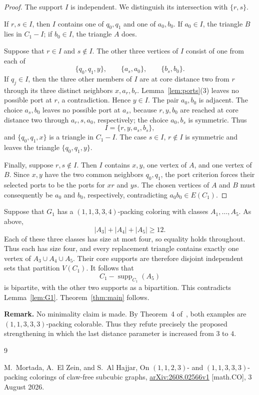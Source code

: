 \documentclass[11pt]{amsart}
\newcommand{\supp}{\operatorname{supp}}
\begin{document}
\begin{proof}
The support $I$ is independent. We distinguish its intersection with
$\{r,s\}$.

If $r,s\in I$, then $I$ contains one of $q_0,q_1$ and one of $a_0,b_0$.
If $a_0\in I$, the triangle $B$ lies in $C_1-I$; if $b_0\in I$, the
triangle $A$ does.

Suppose that $r\in I$ and $s\notin I$. The other three vertices of $I$
consist of one from each of
\[
 \{q_0,q_1,y\},\qquad \{a_s,a_0\},\qquad \{b_s,b_0\}.
\]
If $q_j\in I$, then the three other members of $I$ are at core distance
two from $r$ through its three distinct neighbors $x,a_r,b_r$.
Lemma~\ref{lem:ports}(3) leaves no possible port at $r$, a contradiction.
Hence $y\in I$. The pair $a_0,b_0$ is adjacent. The choice $a_s,b_0$
leaves no possible port at $a_s$, because $r,y,b_0$ are reached at core
distance two through $a_r,s,a_0$, respectively; the choice $a_0,b_s$ is
symmetric. Thus
\[
 I=\{r,y,a_s,b_s\},
\]
and $\{q_0,q_1,x\}$ is a triangle in $C_1-I$. The case
$s\in I$, $r\notin I$ is symmetric and leaves the triangle
$\{q_0,q_1,y\}$.

Finally, suppose $r,s\notin I$. Then $I$ contains $x,y$, one vertex of
$A$, and one vertex of $B$. Since $x,y$ have the two common neighbors
$q_0,q_1$, the port criterion forces their selected ports to be the ports
for $xr$ and $ys$. The chosen vertices of $A$ and $B$ must consequently
be $a_0$ and $b_0$, respectively, contradicting $a_0b_0\in E(C_1)$.
\end{proof}

Suppose that $G_1$ has a $(1,1,3,3,4)$-packing coloring with classes
$A_1,\ldots,A_5$. As above,
\[
 |A_3|+|A_4|+|A_5|\ge12.
\]
Each of these three classes has size at most four, so equality holds
throughout. Thus each has size four, and every replacement triangle
contains exactly one vertex of $A_3\cup A_4\cup A_5$. Their core supports
are therefore disjoint independent sets that partition $V(C_1)$. It
follows that
\[
 C_1-\supp_{C_1}(A_5)
\]
is bipartite, with the other two supports as a bipartition. This
contradicts Lemma~\ref{lem:G1}. Theorem~\ref{thm:main} follows.

\medskip
\noindent\textbf{Remark.}
No minimality claim is made. By Theorem~4 of~\cite{MEH}, both examples are
$(1,1,3,3,3)$-packing colorable. Thus they refute precisely the proposed
strengthening in which the last distance parameter is increased from
$3$ to $4$.

\begin{thebibliography}{9}

M.~Mortada, A.~El Zein, and S.~Al Hajjar,
\newblock On $(1,1,2,3)$- and $(1,1,3,3,3)$-packing colorings of
claw-free subcubic graphs,
\newblock \href{https://arxiv.org/abs/2608.02566v1}
{arXiv:2608.02566v1} [math.CO], 3 August 2026.

\end{thebibliography}
\end{document}

